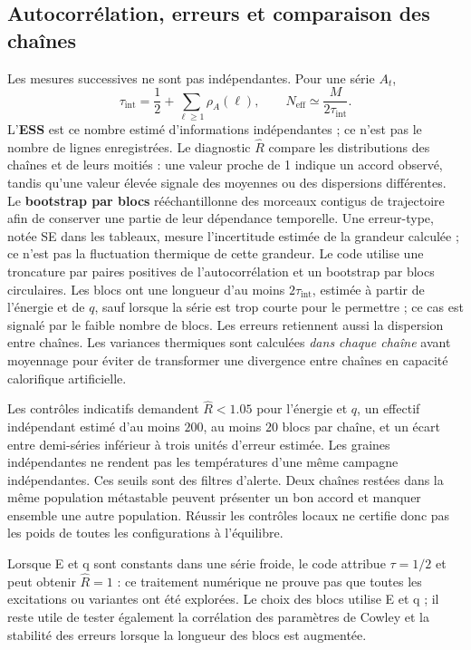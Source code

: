 \documentclass[10pt,a4paper]{article}
\begin{document}
\subsection{Autocorrélation, erreurs et comparaison des chaînes}
Les mesures successives ne sont pas indépendantes. Pour une série $A_t$,
\[
\tau_{\mathrm{int}}=\frac12+\sum_{\ell\ge1}\rho_A(\ell),\qquad
N_{\mathrm{eff}}\simeq\frac{M}{2\tau_{\mathrm{int}}}.
\]
L'\textbf{ESS} est ce nombre estimé d'informations indépendantes ;
ce n'est pas le nombre de lignes enregistrées. Le diagnostic
$\widehat R$ compare les distributions des chaînes et de leurs moitiés :
une valeur proche de 1 indique un accord observé, tandis qu'une valeur
élevée signale des moyennes ou des dispersions différentes.
Le \textbf{bootstrap par blocs} rééchantillonne des morceaux contigus
de trajectoire afin de conserver une partie de leur dépendance temporelle.
Une erreur-type, notée SE dans les tableaux, mesure l'incertitude estimée
de la grandeur calculée ; ce n'est pas la fluctuation thermique de cette grandeur.
Le code utilise une troncature par paires positives de l'autocorrélation
et un bootstrap par blocs circulaires. Les blocs ont une longueur d'au moins
$2\tau_{\mathrm{int}}$, estimée à partir de l'énergie et de $q$, sauf lorsque
la série est trop courte pour le permettre ; ce cas est signalé par le faible
nombre de blocs. Les erreurs retiennent aussi la dispersion entre chaînes.
Les variances thermiques sont calculées \emph{dans chaque chaîne} avant
moyennage pour éviter de transformer une divergence entre chaînes en
capacité calorifique artificielle.

Les contrôles indicatifs demandent $\widehat R<1.05$ pour l'énergie et $q$,
un effectif indépendant estimé d'au moins $200$, au moins $20$ blocs par
chaîne, et un écart entre demi-séries inférieur à trois unités d'erreur
estimée. Les graines indépendantes ne rendent pas les températures d'une
même campagne indépendantes.
Ces seuils sont des filtres d'alerte. Deux chaînes restées dans la même
population métastable peuvent présenter un bon accord et manquer ensemble
une autre population. Réussir les contrôles locaux ne certifie donc pas
les poids de toutes les configurations à l'équilibre.

Lorsque E et q sont constants dans une série froide, le code attribue
$\tau=1/2$ et peut obtenir $\widehat R=1$ : ce traitement numérique ne
prouve pas que toutes les excitations ou variantes ont été explorées.
Le choix des blocs utilise E et q ; il reste utile de tester également
la corrélation des paramètres de Cowley et la stabilité des erreurs
lorsque la longueur des blocs est augmentée.
\end{document}
